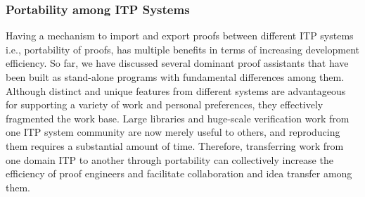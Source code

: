


\subsubsection{Portability among ITP Systems}
Having a mechanism to import and export proofs between different ITP systems i.e., portability of proofs, has multiple benefits in terms of increasing development efficiency. So far, we have discussed several dominant proof assistants that have been built as stand-alone programs with fundamental differences among them. Although distinct and unique features from different systems are advantageous for supporting a variety of work and personal preferences, they effectively fragmented the work base. Large libraries and huge-scale verification work from one ITP system community are now merely useful to others, and reproducing them requires a substantial amount of time. Therefore, transferring work from one domain ITP to another through portability can collectively increase the efficiency of proof engineers and facilitate collaboration and idea transfer among them. 

